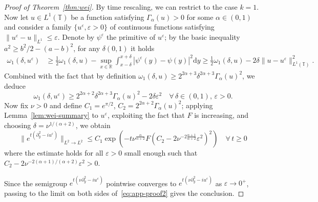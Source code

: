 \documentclass[11pt,oneside,reqno]{amsart}
\newcommand{\mathd}{\mathrm{d}}
\numberwithin{equation}{section}
\begin{document}
\begin{proof}[Proof of Theorem~\ref{thm:wei}]
  By time rescaling, we can restrict to the case $k = 1$. Now let $u \in L^1
  (\mathbb{T})$ be a function satisfying $\Gamma_{\alpha} (u) > 0$ for some
  $\alpha \in (0, 1)$ and consider a family $\{ u^{\varepsilon}, \varepsilon >
  0 \}$ of continuous functions satisfying $\| u^{\varepsilon} - u \|_{L^1}
  \leqslant \varepsilon$. Denote by $\psi^{\varepsilon}$ the primitive of
  $u^{\varepsilon}$; by the basic inequality $a^2 \geqslant b^2 / 2 - (a -
  b)^2$, for any $\delta (0, 1)$ it holds
%
\begin{align*}
       \omega_1 (\delta, u^{\varepsilon}) & \geqslant \frac{1}{2} \omega_1
       (\delta, u) - \sup_{x \in \mathbb{R}} \int_{x - \delta}^{x + \delta} |
       \psi^{\varepsilon} (y) - \psi (y) |^2 \mathd y
       \geqslant \frac{1}{2} \omega_1 (\delta, u) - 2 \delta \| u -
       u^{\varepsilon} \|_{L^1 (\mathbb{T})}^2 .
\end{align*}
%
  Combined with the fact that by definition $\omega_1 (\delta, u) \geqslant
  2^{2 \alpha + 3} \delta^{2 \alpha + 3} \Gamma_{\alpha} (u)^2$, we deduce
  \begin{equation*}
    \omega_1 (\delta, u^{\varepsilon}) \geqslant 2^{2 \alpha + 2} \delta^{2
    \alpha + 3} \Gamma_{\alpha} (u)^2 - 2 \delta \varepsilon^2 \quad \forall
    \, \delta \in (0, 1), \, \varepsilon > 0.
  \end{equation*}
  Now fix $\nu > 0$ and define $C_1 = e^{\pi / 2}$, $C_2 = 2^{2 \alpha + 2}
  \Gamma_{\alpha} (u)^2$; applying Lemma~\ref{lem:wei-summary} to
  $u^{\varepsilon}$, exploiting the fact that $F$ is increasing, and choosing
  $\delta = \nu^{1 / (\alpha + 2)}$, we obtain
  \begin{equation}
    \| e^{t (\partial_y^2 - i u^{\varepsilon})} \|_{L^2 \rightarrow L^2}
    \leqslant C_1 \exp \left( - t \nu^{\frac{\alpha}{\alpha + 2}} F \left( C_2
    - 2 \nu^{- 2 \frac{\alpha + 1}{\alpha + 2}} \varepsilon^2 \right)^2
    \right) \quad \forall \, t \geqslant 0 \label{eq:app-proof2}
  \end{equation}
  where the estimate holds for all $\varepsilon > 0$ small enough such that
  $C_2 - 2 \nu^{- 2 (\alpha + 1) / (\alpha + 2)} \varepsilon^2 > 0$.
  
  Since the semigroup $e^{t (\nu \partial_y^2 - i u^{\varepsilon})}$ pointwise
  converges to $e^{t (\nu \partial_y^2 - i u^{\varepsilon})}$ as $\varepsilon
  \rightarrow 0^+$, passing to the limit on both sides
  of~\eqref{eq:app-proof2} gives the conclusion.
\end{proof}
\end{document}

